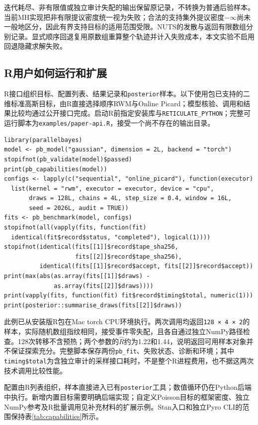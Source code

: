 \documentclass[UTF8,fontset=fandol,zihao=-4]{ctexart}
\begin{document}
迭代耗尽、非有限值或独立审计失配的输出保留原记录，不转换为普通后验样本。当前MH实现把非有限提议密度统一视为失败；合法的支持集外提议密度$-\infty$尚未一般地区分，因此有界支持目标的适用范围受限。NUTS的发散与返回有限数组分别记录。显式顺序回退复用原数组重算整个轨迹并计入失败成本，本文实验不启用回退隐藏求解失败。

\subsection{R用户如何运行和扩展}
R接口组织目标、配置列表、结果记录和\texttt{posterior}样本。以下使用包已支持的二维标准高斯目标，由R直接选择顺序RWM与Online Picard；模型核验、调用和结果比较均通过公开接口完成。启动R前指定安装库与\texttt{RETICULATE\_PYTHON}；完整可运行脚本为\texttt{examples/paper-api.R}，接受一个尚不存在的输出目录。
\begingroup\small
\begin{verbatim}
library(parallelbayes)
model <- pb_model("gaussian", dimension = 2L, backend = "torch")
stopifnot(pb_validate(model)$passed)
print(pb_capabilities(model))
configs <- lapply(c("sequential", "online_picard"), function(executor)
  list(kernel = "rwm", executor = executor, device = "cpu",
       draws = 128L, chains = 4L, step_size = 0.4, window = 16L,
       seed = 2026L, audit = TRUE))
fits <- pb_benchmark(model, configs)
stopifnot(all(vapply(fits, function(fit)
  identical(fit$record$status, "completed"), logical(1))))
stopifnot(identical(fits[[1]]$record$tape_sha256,
                    fits[[2]]$record$tape_sha256),
          identical(fits[[1]]$record$accept, fits[[2]]$record$accept))
print(max(abs(as.array(fits[[1]]$draws) -
              as.array(fits[[2]]$draws))))
print(vapply(fits, function(fit) fit$record$timing$total, numeric(1)))
print(posterior::summarise_draws(fits[[2]]$draws))
\end{verbatim}
\endgroup
此例已从安装版R包在Mac torch CPU环境执行。两次调用均返回\texttt{128 × 4 × 2}的样本，实际随机数组指纹相同，接受事件零失配，且各自通过独立NumPy路径检查。128次转移不含预热；两个参数的$\hat R$约为1.22和1.44，说明返回可用样本对象并不保证探索充分。完整脚本保存两份\texttt{pb\_fit}、失败状态、诊断和环境；其中\texttt{timing\$total}为含独立审计的采样接口耗时，不是整个R进程费用，也不据这两次技术调用比较性能。

配置由R列表组织，样本直接进入已有\texttt{posterior}工具；数值循环仍在Python后端中执行。新增内置目标需要明确后端实现；自定义Poisson目标的框架密度、独立NumPy参考及R批量调用见补充材料的扩展示例。Stan入口和独立Pyro CLI的范围保持表\ref{tab:capabilities}所示。
\end{document}
